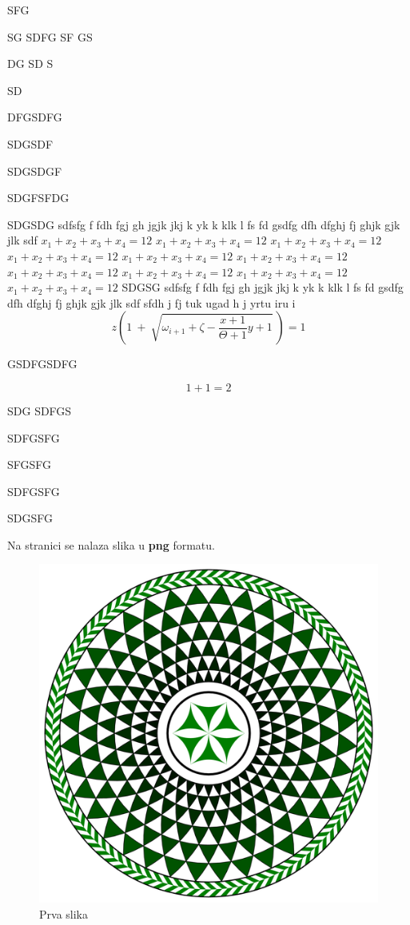 \documentclass[a4paper,twoside,12pt]{memoir} %
\begin{document}
SFG

SG
SDFG
SF
GS

DG
 SD
S


SD
 

DFGSDFG


SDGSDF


SDGSDGF


SDGFSFDG


SDGSDG  sdfsfg f fdh fgj gh jgjk jkj k yk k klk l fs fd gsdfg dfh dfghj fj ghjk gjk jlk sdf 
$x_1+x_2+x_3+x_4=12$ $x_1+x_2+x_3+x_4=12$
 $x_1+x_2+x_3+x_4=12$ $x_1+x_2+x_3+x_4=12$ $x_1+x_2+x_3+x_4=12$ $x_1+x_2+x_3+x_4=12$
 $x_1+x_2+x_3+x_4=12$ $x_1+x_2+x_3+x_4=12$ $x_1+x_2+x_3+x_4=12$
$x_1+x_2+x_3+x_4=12$ 
SDGSG sdfsfg f fdh fgj gh jgjk jkj k yk k klk l fs fd gsdfg dfh dfghj fj ghjk gjk jlk sdf sfdh j fj tuk ugad h j yrtu iru i
\[ z \left( 1 \ +\ \sqrt{\omega_{i+1} + \zeta -\frac{x+1}{\Theta +1} y + 1}
\ \right) =  1 \]

GSDFGSDFG



\begin{equation}
\label{eq:jed111}
	1+1=2
\end{equation}

SDG
SDFGS

SDFGSFG


SFGSFG


SDFGSFG


SDGSFG

\label{stranica}
Na stranici \pageref{stranica} se nalaza slika u \textbf{png} formatu.
\begin{figure}[h!t]
\begin{center}
\includegraphics[scale=0.5]{mosaic-from-pompeii.png}
\caption{Prva slika}
\end{center}
\end{figure}
\end{document}
